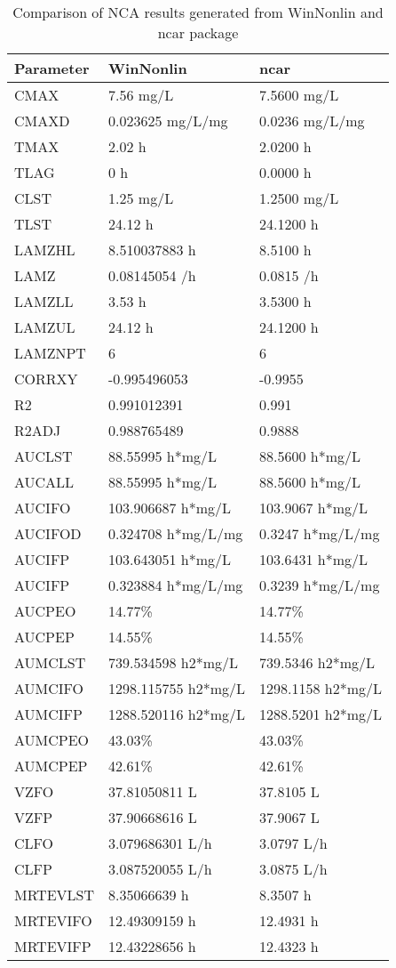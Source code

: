 \documentclass[12pt,]{krantz}
\theoremstyle{definition}
\theoremstyle{definition}
\theoremstyle{definition}
\theoremstyle{remark}
\begin{document}
\begin{table}

\caption{\label{tab:table3}Comparison of NCA results generated from WinNonlin and ncar package}
\centering
\begin{tabular}[t]{l|l|l}
\hline
Parameter & WinNonlin & ncar\\
\hline
CMAX & 7.56 mg/L & 7.5600 mg/L\\
\hline
CMAXD & 0.023625 mg/L/mg & 0.0236 mg/L/mg\\
\hline
TMAX & 2.02 h & 2.0200 h\\
\hline
TLAG & 0 h & 0.0000 h\\
\hline
CLST & 1.25 mg/L & 1.2500 mg/L\\
\hline
TLST & 24.12 h & 24.1200 h\\
\hline
LAMZHL & 8.510037883 h & 8.5100 h\\
\hline
LAMZ & 0.08145054 /h & 0.0815 /h\\
\hline
LAMZLL & 3.53 h & 3.5300 h\\
\hline
LAMZUL & 24.12 h & 24.1200 h\\
\hline
LAMZNPT & 6 & 6\\
\hline
CORRXY & -0.995496053 & -0.9955\\
\hline
R2 & 0.991012391 & 0.991\\
\hline
R2ADJ & 0.988765489 & 0.9888\\
\hline
AUCLST & 88.55995 h*mg/L & 88.5600 h*mg/L\\
\hline
AUCALL & 88.55995 h*mg/L & 88.5600 h*mg/L\\
\hline
AUCIFO & 103.906687 h*mg/L & 103.9067 h*mg/L\\
\hline
AUCIFOD & 0.324708 h*mg/L/mg & 0.3247 h*mg/L/mg\\
\hline
AUCIFP & 103.643051 h*mg/L & 103.6431 h*mg/L\\
\hline
AUCIFP & 0.323884 h*mg/L/mg & 0.3239 h*mg/L/mg\\
\hline
AUCPEO & 14.77\% & 14.77\%\\
\hline
AUCPEP & 14.55\% & 14.55\%\\
\hline
AUMCLST & 739.534598 h2*mg/L & 739.5346 h2*mg/L\\
\hline
AUMCIFO & 1298.115755 h2*mg/L & 1298.1158 h2*mg/L\\
\hline
AUMCIFP & 1288.520116 h2*mg/L & 1288.5201 h2*mg/L\\
\hline
AUMCPEO & 43.03\% & 43.03\%\\
\hline
AUMCPEP & 42.61\% & 42.61\%\\
\hline
VZFO & 37.81050811 L & 37.8105 L\\
\hline
VZFP & 37.90668616 L & 37.9067 L\\
\hline
CLFO & 3.079686301 L/h & 3.0797 L/h\\
\hline
CLFP & 3.087520055 L/h & 3.0875 L/h\\
\hline
MRTEVLST & 8.35066639 h & 8.3507 h\\
\hline
MRTEVIFO & 12.49309159 h & 12.4931 h\\
\hline
MRTEVIFP & 12.43228656 h & 12.4323 h\\
\hline
\end{tabular}
\end{table}
\end{document}
